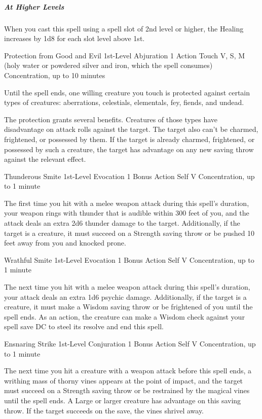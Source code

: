 \documentclass[letterpaper,openany,oneside,twocolumn]{book}
\begin{document}
\subparagraph*{At Higher Levels} When you cast this spell using a spell slot of 2nd level or higher, the Healing increases by 1d8 for each slot level above 1st.

\DndSpellHeader
  {Protection from Good and Evil}
  {1st-Level Abjuration}
  {1 Action}
  {Touch}
  {V, S,  M (holy water or powdered silver and iron, which the spell consumes)}
  {Concentration, up to 10 minutes}

Until the spell ends, one willing creature you touch is protected against certain types of creatures: aberrations, celestials, elementals, fey, fiends, and undead.

The protection grants several benefits. Creatures of those types have disadvantage on attack rolls against the target. The target also can't be charmed, frightened, or possessed by them. If the target is already charmed, frightened, or possessed by such a creature, the target has advantage on any new saving throw against the relevant effect.

\DndSpellHeader
  {Thunderous Smite}
  {1st-Level Evocation}
  {1 Bonus Action}
  {Self}
  {V}
  {Concentration, up to 1 minute}

The first time you hit with a melee weapon attack during this spell's duration, your weapon rings with thunder that is audible within 300 feet of you, and the attack deals an extra 2d6 thunder damage to the target. Additionally, if the target is a creature, it must succeed on a Strength saving throw or be pushed 10 feet away from you and knocked prone.

\DndSpellHeader
  {Wrathful Smite}
  {1st-Level Evocation}
  {1 Bonus Action}
  {Self}
  {V}
  {Concentration, up to 1 minute}

The next time you hit with a melee weapon attack during this spell's duration, your attack deals an extra 1d6 psychic damage. Additionally, if the target is a creature, it must make a Wisdom saving throw or be frightened of you until the spell ends. As an action, the creature can make a Wisdom check against your spell save DC to steel its resolve and end this spell.

\DndSpellHeader
  {Ensnaring Strike}
  {1st-Level Conjuration}
  {1 Bonus Action}
  {Self}
  {V}
  {Concentration, up to 1 minute}

The next time you hit a creature with a weapon attack before this spell ends, a writhing mass of thorny vines appears at the point of impact, and the target must succeed on a Strength saving throw or be restrained by the magical vines until the spell ends. A Large or larger creature has advantage on this saving throw. If the target succeeds on the save, the vines shrivel away.
\end{document}

